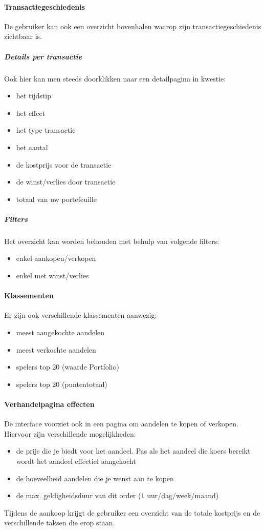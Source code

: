 \paragraph{Transactiegeschiedenis}De gebruiker kan ook een overzicht bovenhalen waarop zijn transactiegeschiedenis zichtbaar is. 
\subparagraph{Details per transactie}Ook hier kan men steeds doorklikken naar een detailpagina in kwestie:
\begin{itemize}
  \setlength{\itemsep}{1pt}
  \setlength{\parskip}{0pt}
  \setlength{\parsep}{0pt}
	\item{het tijdstip}
	\item{het effect}
	\item{het type transactie}
	\item{het aantal}
	\item{de kostprijs voor de transactie}
	\item{de winst/verlies door transactie}
	\item{totaal van uw portefeuille}
\end{itemize}
\subparagraph{Filters}Het overzicht kan worden behouden met behulp van volgende filters:
\begin{itemize}
  \setlength{\itemsep}{1pt}
  \setlength{\parskip}{0pt}
  \setlength{\parsep}{0pt}
	\item{enkel aankopen/verkopen}
	\item{enkel met winst/verlies}
\end{itemize}

\paragraph{Klassementen}Er zijn ook verschillende klassementen aanwezig:
\begin{itemize}
  \setlength{\itemsep}{1pt}
  \setlength{\parskip}{0pt}
  \setlength{\parsep}{0pt}
	\item{meest aangekochte aandelen}
	\item{meest verkochte aandelen}
	\item{spelers top 20 (waarde Portfolio)}
	\item{spelers top 20 (puntentotaal)}
\end{itemize}

\paragraph{Verhandelpagina effecten}De interface voorziet ook in een pagina om aandelen te kopen of verkopen. Hiervoor zijn verschillende mogelijkheden:
\begin{itemize}
  \setlength{\itemsep}{1pt}
  \setlength{\parskip}{0pt}
  \setlength{\parsep}{0pt}
	\item{de prijs die je biedt voor het aandeel. Pas als het aandeel die koers bereikt wordt het aandeel effectief aangekocht}
	\item{de hoeveelheid aandelen die je wenst aan te kopen}
	\item{de max. geldigheidsduur van dit order (1 uur/dag/week/maand)}
\end{itemize}
Tijdens de aankoop krijgt de gebruiker een overzicht van de totale kostprijs en de verschillende taksen die erop staan.

